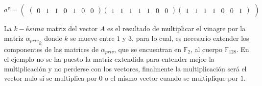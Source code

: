 \begin{equation}\label{eq:ej-vinegar}
{a^v} = 
	\left(\begin{matrix}
		\left(\begin{smallmatrix}
			0 & 1 & 1 & 0 & 1 & 0 & 0
		\end{smallmatrix}\right)
	
		\left(\begin{smallmatrix}
			1 & 1 & 1 & 1 & 1 & 0 & 0
		\end{smallmatrix}\right)
	
		\left(\begin{smallmatrix}
			1 & 1 & 1 & 1 & 0 & 0 & 1
		\end{smallmatrix}\right)
	\end{matrix}\right)
\end{equation}

La $k-ésima$ matriz del vector $A$ es el resultado de multiplicar el vinagre por la matriz ${\alpha_{priv}}_k$ donde $k$ se mueve entre $1$ y $3$, para lo cual, es necesario extender los componentes de las matrices de $\alpha_{priv}$, que se encuentran en $\mathds{F}_{2}$, al cuerpo $\mathds{F}_{128}$. En el ejemplo no se ha puesto la matriz extendida para entender mejor la multiplicación y no perderse con los vectores, finalmente la multiplicación será el vector nulo si se multiplica por $0$ o el mismo vector cuando se multiplique por $1$.

